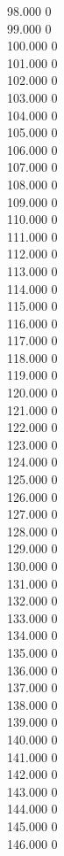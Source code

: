 { 98.000	0 \\
 99.000	0 \\
 100.000	0 \\
 101.000	0 \\
 102.000	0 \\
 103.000	0 \\
 104.000	0 \\
 105.000	0 \\
 106.000	0 \\
 107.000	0 \\
 108.000	0 \\
 109.000	0 \\
 110.000	0 \\
 111.000	0 \\
 112.000	0 \\
 113.000	0 \\
 114.000	0 \\
 115.000	0 \\
 116.000	0 \\
 117.000	0 \\
 118.000	0 \\
 119.000	0 \\
 120.000	0 \\
 121.000	0 \\
 122.000	0 \\
 123.000	0 \\
 124.000	0 \\
 125.000	0 \\
 126.000	0 \\
 127.000	0 \\
 128.000	0 \\
 129.000	0 \\
 130.000	0 \\
 131.000	0 \\
 132.000	0 \\
 133.000	0 \\
 134.000	0 \\
 135.000	0 \\
 136.000	0 \\
 137.000	0 \\
 138.000	0 \\
 139.000	0 \\
 140.000	0 \\
 141.000	0 \\
 142.000	0 \\
 143.000	0 \\
 144.000	0 \\
 145.000	0 \\
 146.000	0 \\
}
